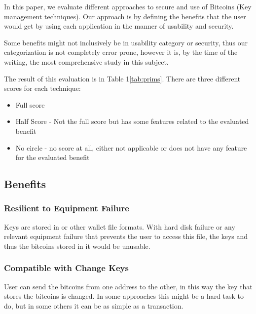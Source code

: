 In this paper, we evaluate different approaches to secure and use of Bitcoins (Key management techniques). Our approach is by defining the benefits that the user would get by using each application in the manner of usability and security.

Some benefits might not inclusively be in usability category or security, thus our categorization is not completely error prone, however it is, by the time of the writing, the most comprehensive  study in this subject.

The result of this evaluation is in Table 1\ref{tab:prims}. There are three different scores for each technique:\\

\begin{itemize}
\renewcommand{\labelitemi}{$\bullet$}
\item Full score
\renewcommand{\labelitemi}{$\circ$}
\item Half Score - Not the full score but has some features related to the evaluated benefit
\renewcommand{\labelitemi}{$\textvisiblespace$}
\item No circle - no score at all, either not applicable or does not have any feature for the evaluated benefit
\end{itemize}

\subsection{Benefits}

\subsubsection{Resilient to Equipment Failure}
\label{Resilient to Equipment Failure}

Keys are stored in \walletfile or other wallet file formats. With hard disk failure or any relevant equipment failure that prevents the user to access this file, the keys and thus the bitcoins stored in it would be unusable.

\subsubsection{Compatible with Change Keys}
\label{Compatible with Change Keys}

User can send the bitcoins from one address to the other, in this way the key that stores the bitcoins is changed. In some approaches this might be a hard task to do, but in some others it can be as simple as a transaction.

